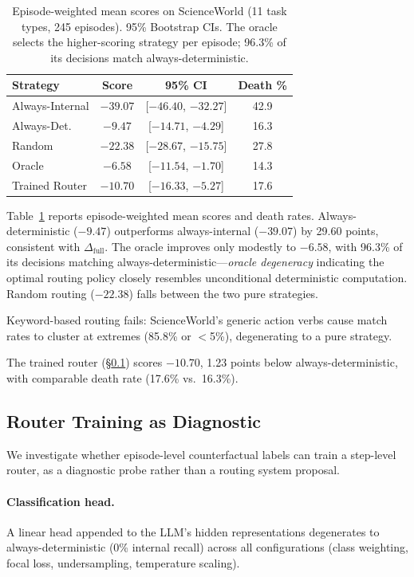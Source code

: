 \begin{table}[t]
\centering
\small
\begin{tabular}{@{}lccc@{}}
\toprule
Strategy & Score & 95\% CI & Death \% \\
\midrule
Always-Internal & $-39.07$ & [$-46.40$, $-32.27$] & 42.9 \\
Always-Det. & $-9.47$ & [$-14.71$, $-4.29$] & 16.3 \\
Random & $-22.38$ & [$-28.67$, $-15.75$] & 27.8 \\
Oracle & $-6.58$ & [$-11.54$, $-1.70$] & 14.3 \\
\midrule
Trained Router & $-10.70$ & [$-16.33$, $-5.27$] & 17.6 \\
\bottomrule
\end{tabular}
\caption{Episode-weighted mean scores on ScienceWorld (11 task types, 245 episodes). 95\% Bootstrap CIs. The oracle selects the higher-scoring strategy per episode; 96.3\% of its decisions match always-deterministic.}
\label{tab:baselines}
\end{table}

Table~\ref{tab:baselines} reports episode-weighted mean scores and death rates. Always-deterministic ($-9.47$) outperforms always-internal ($-39.07$) by 29.60 points, consistent with $\Delta_{\text{full}}$. The oracle improves only modestly to $-6.58$, with 96.3\% of its decisions matching always-deterministic---\emph{oracle degeneracy} indicating the optimal routing policy closely resembles unconditional deterministic computation. Random routing ($-22.38$) falls between the two pure strategies.

Keyword-based routing fails: ScienceWorld's generic action verbs cause match rates to cluster at extremes (85.8\% or $<$5\%), degenerating to a pure strategy.

The trained router (\S\ref{sec:router-diagnostic}) scores $-10.70$, 1.23 points below always-deterministic, with comparable death rate (17.6\% vs.\ 16.3\%).

\subsection{Router Training as Diagnostic}
\label{sec:router-diagnostic}

We investigate whether episode-level counterfactual labels can train a step-level router, as a diagnostic probe rather than a routing system proposal.

\paragraph{Classification head.} A linear head appended to the LLM's hidden representations degenerates to always-deterministic (0\% internal recall) across all configurations (class weighting, focal loss, undersampling, temperature scaling).

